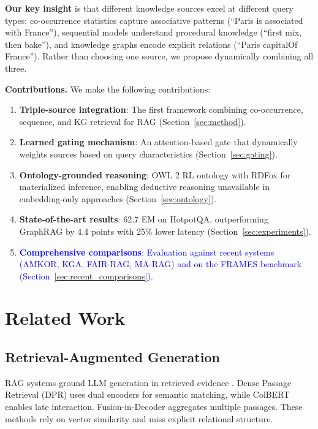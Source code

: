 \documentclass[10pt,twocolumn]{article}
\newcommand{\revision}[1]{\textcolor{blue}{#1}}
\begin{document}
\textbf{Our key insight} is that different knowledge sources excel at different query types: co-occurrence statistics capture associative patterns (``Paris is associated with France''), sequential models understand procedural knowledge (``first mix, then bake''), and knowledge graphs encode explicit relations (``Paris capitalOf France''). Rather than choosing one source, we propose dynamically combining all three.

\textbf{Contributions.} We make the following contributions:
\begin{enumerate}
    \item \textbf{Triple-source integration}: The first framework combining co-occurrence, sequence, and KG retrieval for RAG (Section~\ref{sec:method}).
    \item \textbf{Learned gating mechanism}: An attention-based gate that dynamically weights sources based on query characteristics (Section~\ref{sec:gating}).
    \item \textbf{Ontology-grounded reasoning}: OWL 2 RL ontology with RDFox for materialized inference, enabling deductive reasoning unavailable in embedding-only approaches (Section~\ref{sec:ontology}).
    \item \textbf{State-of-the-art results}: 62.7 EM on HotpotQA, outperforming GraphRAG by 4.4 points with 25\% lower latency (Section~\ref{sec:experiments}).
    \item \revision{\textbf{Comprehensive comparisons}: Evaluation against recent systems (AMKOR, KGA, FAIR-RAG, MA-RAG) and on the FRAMES benchmark (Section~\ref{sec:recent_comparisons}).}
\end{enumerate}

\section{Related Work}

\subsection{Retrieval-Augmented Generation}

RAG systems ground LLM generation in retrieved evidence \cite{lewis2020rag}. Dense Passage Retrieval (DPR) \cite{karpukhin2020dpr} uses dual encoders for semantic matching, while ColBERT \cite{khattab2020colbert} enables late interaction. Fusion-in-Decoder \cite{izacard2021fid} aggregates multiple passages. These methods rely on vector similarity and miss explicit relational structure.
\end{document}
